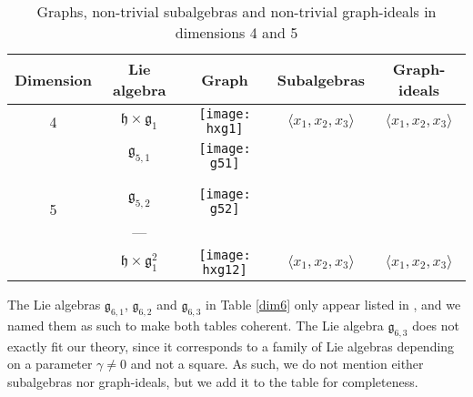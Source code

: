 \documentclass[12pt]{amsart}
\begin{document}
\begin{table}[h]
\caption{Graphs, non-trivial subalgebras and non-trivial graph-ideals in dimensions 4 and 5}\label{dim45}
\begin{tabular}{|c|c|c|c|c|}
\hline
Dimension& Lie algebra & Graph & Subalgebras& Graph-ideals \\ \hline
4& $\mathfrak{h}\times \mathfrak{g}_1$ & 	\begin{minipage}{3cm}\texttt{[image: hxg1]}\end{minipage} & $\langle x_1,x_2,x_3\rangle$ & $\langle x_1,x_2,x_3\rangle$ \\ \hline
\multirow{11}{*}{5} & $\mathfrak{g}_{5,1}$ & \begin{minipage}{3cm}\vspace{0.1cm}\texttt{[image: g51]}\vspace{0.1cm}\end{minipage} & \begin{minipage}{2cm}$\langle x_1,x_2,x_5\rangle$\\$\langle x_3,x_4,x_5\rangle$\end{minipage} &
\begin{minipage}{2cm}$\langle x_1,x_2,x_5\rangle$\\$\langle x_3,x_4,x_5\rangle$\end{minipage}\\ \cline{2-5}
&$\mathfrak{g}_{5,2}$  & \begin{minipage}{3cm}\vspace{0.1cm}\texttt{[image: g52]}\end{minipage} & 
\begin{minipage}{2cm}$\langle x_1,x_3,x_5\rangle$\\$\langle x_1,x_2,x_4\rangle$\end{minipage}& --- \\\cline{2-5}
 & $\mathfrak{h}\times \mathfrak{g}_1^2$  & \begin{minipage}{3cm}\vspace{0.1cm}\texttt{[image: hxg12]}\vspace{0.1cm}\end{minipage} & $\langle x_1,x_2,x_3\rangle$ & $\langle x_1,x_2,x_3\rangle$ \\ \hline
\end{tabular}
\end{table}


The Lie algebras $\mathfrak{g}_{6,1}$, $\mathfrak{g}_{6,2}$ and $\mathfrak{g}_{6,3}$ in Table \ref{dim6} only appear listed in \cite{magnin}, and we named them as such to make both tables coherent. The Lie algebra $\mathfrak{g}_{6,3}$ does not exactly fit our theory, since it corresponds to a family of Lie algebras depending on a parameter $\gamma\neq0$ and not a square. As such, we do not mention either subalgebras nor graph-ideals, but we add it to the table for completeness.
\end{document}

